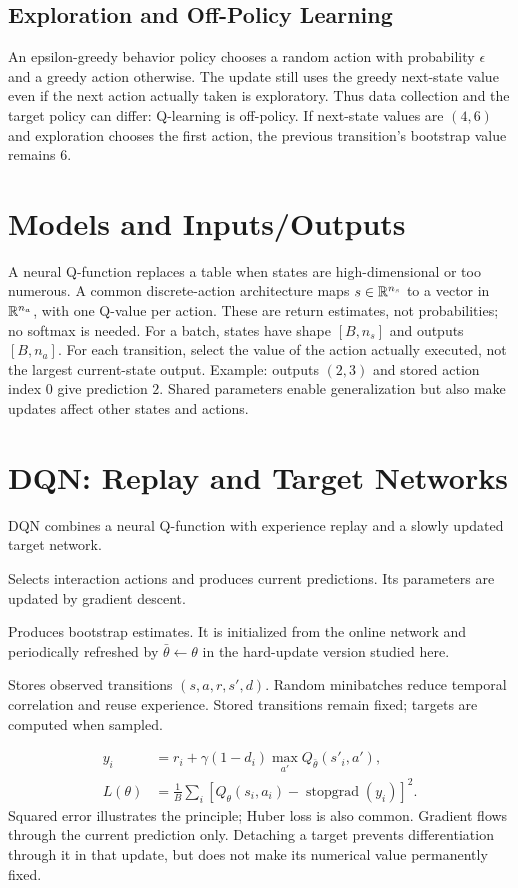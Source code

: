\subsection{Exploration and Off-Policy Learning}
An epsilon-greedy behavior policy chooses a random action with
probability $\epsilon$ and a greedy action otherwise.
The update still uses the greedy next-state value even if the
next action actually taken is exploratory. Thus data collection
and the target policy can differ: Q-learning is off-policy.
If next-state values are $(4,6)$ and exploration chooses the first
action, the previous transition's bootstrap value remains $6$.

\section{Models and Inputs/Outputs}
A neural Q-function replaces a table when states are high-dimensional
or too numerous. A common discrete-action architecture maps
$s\in\mathbb{R}^{n_s}$ to a vector in $\mathbb{R}^{n_a}$, with one Q-value per action.
These are return estimates, not probabilities; no softmax is needed.
For a batch, states have shape $[B,n_s]$ and outputs $[B,n_a]$.
For each transition, select the value of the action actually executed,
not the largest current-state output.
Example: outputs $(2,3)$ and stored action index $0$ give prediction $2$.
Shared parameters enable generalization but also make updates affect
other states and actions.

\section{DQN: Replay and Target Networks}
DQN combines a neural Q-function with experience replay and a slowly
updated target network.
\begin{description}[style=nextline]
\item[Online network $Q_\theta$] Selects interaction actions and produces
current predictions. Its parameters are updated by gradient descent.
\item[Target network $Q_{\bar\theta}$] Produces bootstrap estimates.
It is initialized from the online network and periodically refreshed
by $\bar\theta\leftarrow\theta$ in the hard-update version studied here.
\item[Replay buffer] Stores observed transitions $(s,a,r,s',d)$.
Random minibatches reduce temporal correlation and reuse experience.
Stored transitions remain fixed; targets are computed when sampled.
\end{description}
\begin{align}
y_i&=r_i+\gamma(1-d_i)\max_{a'}Q_{\bar\theta}(s'_i,a'),\\
L(\theta)&=\frac1B\sum_i
\left[Q_\theta(s_i,a_i)-\operatorname{stopgrad}(y_i)\right]^2.
\end{align}
Squared error illustrates the principle; Huber loss is also common.
Gradient flows through the current prediction only.
Detaching a target prevents differentiation through it in that update,
but does not make its numerical value permanently fixed.

